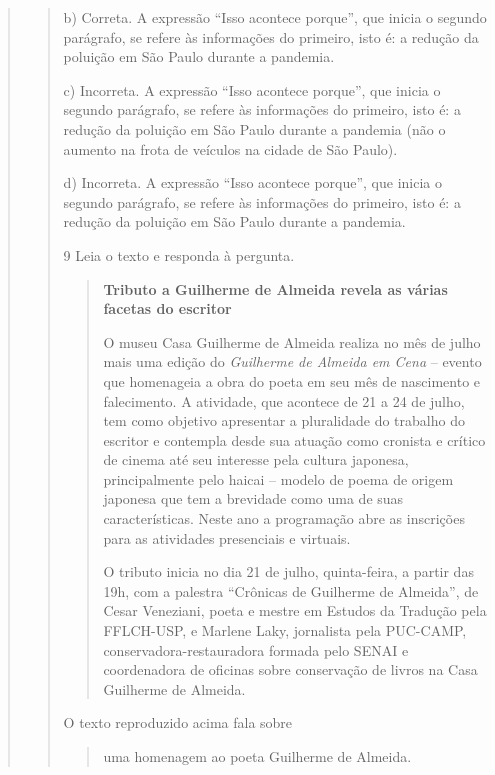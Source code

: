 \begin{escolha}
\begin{escolha}
\begin{escolha}
\begin{quote}
\begin{quote}
{b) Correta. A expressão ``Isso acontece porque'', que inicia o segundo 
parágrafo, se refere às informações do primeiro, isto é: a redução da 
poluição em São Paulo durante a pandemia.

c) Incorreta. A expressão ``Isso acontece porque'', que inicia o segundo 
parágrafo, se refere às informações do primeiro, isto é: a redução da 
poluição em São Paulo durante a pandemia (não o aumento na frota de
veículos na cidade de São Paulo).

d) Incorreta. A expressão ``Isso acontece porque'', que inicia o segundo 
parágrafo, se refere às informações do primeiro, isto é: a redução da poluição em São Paulo durante a pandemia.}

\num{9} Leia o texto e responda à pergunta.

\begin{quote}
\textbf{Tributo a Guilherme de Almeida revela as várias facetas do 
escritor}

O museu Casa Guilherme de Almeida realiza no mês de julho mais uma
edição do \textit{Guilherme de Almeida em Cena} -- evento que homenageia a obra
do poeta em seu mês de nascimento e falecimento. A atividade, que
acontece de 21 a 24 de julho, tem como objetivo apresentar a pluralidade
do trabalho do escritor e contempla desde sua atuação como cronista e
crítico de cinema até seu interesse pela cultura japonesa,
principalmente pelo haicai -- modelo de poema de origem japonesa que tem
a brevidade como uma de suas características. Neste ano a programação
abre as inscrições para as atividades presenciais e virtuais.

O tributo inicia no dia 21 de julho, quinta-feira, a partir das 19h, com
a palestra ``Crônicas de Guilherme de Almeida'', de Cesar Veneziani,
poeta e mestre em Estudos da Tradução pela FFLCH-USP, e Marlene Laky,
jornalista pela PUC-CAMP, conservadora-restauradora formada pelo SENAI e
coordenadora de oficinas sobre conservação de livros na Casa Guilherme
de Almeida.
\end{quote}


O texto reproduzido acima fala sobre

\begin{quote}
  \item uma homenagem ao poeta Guilherme de Almeida.


\end{quote}
\end{quote}
\end{quote}
\end{escolha}
\end{escolha}
\end{escolha}
